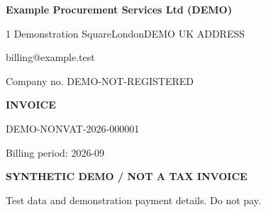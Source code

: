 \documentclass[10pt,a4paper]{article}
\begin{document}
\color{ink}
\raggedright
\begin{minipage}[t]{0.57\textwidth}
\vspace{0pt}
\raggedright
{\Large\bfseries Example Procurement Services Ltd (DEMO)}\par
{\small 1 Demonstration Square\newline{}London\newline{}DEMO UK ADDRESS\par
billing@example.test\par
Company no. DEMO-NOT-REGISTERED

}
\end{minipage}\hfill
\begin{minipage}[t]{0.39\textwidth}\raggedleft
\vspace{0pt}
{\Huge\bfseries INVOICE}\par
{\large DEMO-NONVAT-2026-000001}\par
{\small\color{muted}Billing period: 2026-09}
\end{minipage}
\par\vspace{5mm}

\colorbox{pale}{\parbox{\dimexpr\textwidth-2\fboxsep\relax}{\centering\small\bfseries\color{demo}SYNTHETIC DEMO / NOT A TAX INVOICE\par\normalfont\footnotesize Test data and demonstration payment details. Do not pay.}}
\vspace{4mm}
\end{document}
